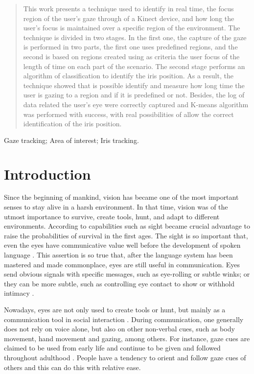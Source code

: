 \documentclass[10pt, conference]{IEEEtran}
\begin{document}
\begin{abstract}
	This work presents a technique used to identify in real time, the focus region of the user's gaze through of a Kinect device, and how long the user’s focus is maintained over a specific region of the environment. The technique is divided in two stages. In the first one, the capture of the gaze is performed in two parts, the first one uses predefined regions, and the second is based on regions created using as criteria the user focus of the length of time on each part of the scenario. The second stage performs an algorithm of classification to identify the iris position. As a result, the technique showed that is possible identify and measure how long time the user is gazing to a region and if it is predefined or not. Besides, the log of data related the user's eye were correctly captured and K-means algorithm was performed with success, with real possibilities of allow the correct identification of the iris position.
\end{abstract}

\begin{IEEEkeywords}
	Gaze tracking; Area of interest; Iris tracking.
\end{IEEEkeywords}


\IEEEpeerreviewmaketitle

\section{Introduction}
	Since the beginning of mankind, vision has became one of the most important senses to stay alive in a harsh environment. 
	In that time, vision was of the utmost importance to survive, create tools, hunt, and adapt to different environments. 
	According to \cite{1} capabilities such as sight became crucial advantage to raise the probabilities of survival in the first ages.
	The sight is so important that, even the eyes have communicative value well before the development of spoken language \cite{2}.
	This assertion is so true that, after the language system has been mastered and made commonplace, eyes are still useful in communication. 
	Eyes send obvious signals with specific messages, such as eye-rolling or subtle winks; or they can be more subtle, such as controlling eye contact to show or withhold intimacy \cite{3}.

	Nowadays, eyes are not only used to create tools or hunt, but mainly as a communication tool in social interaction \cite{4}.
	During communication, one generally does not rely on voice alone, but also on other non-verbal cues, such as body movement, hand movement and gazing, among others.
	For instance, gaze cues are claimed to be used from early life and continue to be given and followed throughout adulthood \cite{4}.
	People have a tendency to orient and follow gaze cues of others and this can do this with relative ease. 
    
\end{document}
